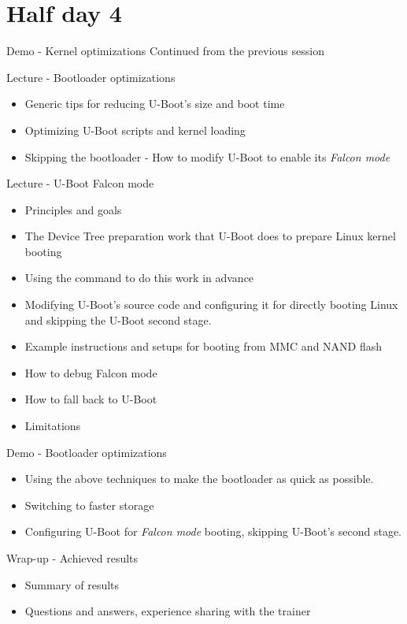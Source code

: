 \documentclass[a4paper,12pt,obeyspaces,spaces,hyphens]{article}
\begin{document}
\section{Half day 4}

\feagendaonecolumn
{Demo - Kernel optimizations}
{
 Continued from the previous session
}

\feagendatwocolumn
{Lecture - Bootloader optimizations}
{
  \begin{itemize}
  \item Generic tips for reducing U-Boot's size and boot time
  \item Optimizing U-Boot scripts and kernel loading
  \item Skipping the bootloader - How to modify U-Boot to
        enable its {\em Falcon mode}
  \end{itemize}
}
{Lecture - U-Boot Falcon mode}
{
  \begin{itemize}
  \item Principles and goals
  \item The Device Tree preparation work that U-Boot does to prepare Linux kernel booting
  \item Using the  command to do this work in advance
  \item Modifying U-Boot's source code and configuring it for directly
        booting Linux and skipping the U-Boot second stage.
  \item Example instructions and setups for booting from MMC and NAND flash
  \item How to debug Falcon mode
  \item How to fall back to U-Boot
  \item Limitations
  \end{itemize}
}

\feagendaonecolumn
{Demo - Bootloader optimizations}
{
 \begin{itemize}
 \item Using the above techniques to make the bootloader
       as quick as possible.
 \item Switching to faster storage
 \item Configuring U-Boot for {\em Falcon mode} booting,
       skipping U-Boot's second stage.
 \end{itemize}
}

\feagendaonecolumn
{Wrap-up - Achieved results}
{
 \begin{itemize}
 \item Summary of results
 \item Questions and answers, experience sharing with the trainer
 \end{itemize}
}
\end{document}
